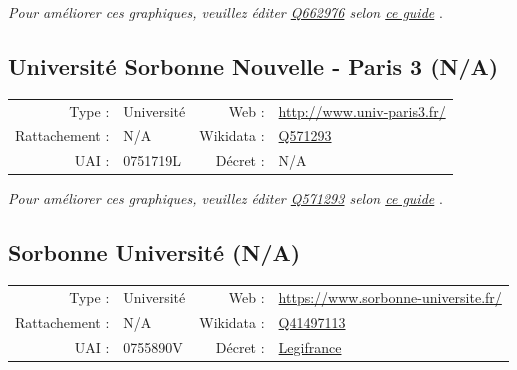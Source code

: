 \documentclass[11pt,french,landscape]{article}
\begin{document}
\textit{\scriptsize Pour améliorer ces graphiques, veuillez éditer \href{https://www.wikidata.org/entity/Q662976}{Q662976}  selon \href{https://github.com/cpesr/wikidataESR/blob/master/Rmd/wikidataESR.md}{ce guide}}
.


\newpage

\hypertarget{universituxe9-sorbonne-nouvelle---paris-3-na}{%
\subsection{Université Sorbonne Nouvelle - Paris 3
(N/A)}\label{universituxe9-sorbonne-nouvelle---paris-3-na}}

\begin{tabular*}{0.45\textwidth}{rp{2cm}rl}  
\hline  
Type : & Université & Web : &\href{http://www.univ-paris3.fr/}{http://www.univ-paris3.fr/} \\  
Rattachement : & N/A & Wikidata : & \href{https://www.wikidata.org/entity/Q571293}{Q571293} \\  
UAI : & 0751719L & Décret : & N/A \\  
\hline  
\end{tabular*}

\textit{\scriptsize Pour améliorer ces graphiques, veuillez éditer \href{https://www.wikidata.org/entity/Q571293}{Q571293}  selon \href{https://github.com/cpesr/wikidataESR/blob/master/Rmd/wikidataESR.md}{ce guide}}
.


\newpage

\hypertarget{sorbonne-universituxe9-na}{%
\subsection{Sorbonne Université (N/A)}\label{sorbonne-universituxe9-na}}

\begin{tabular*}{0.45\textwidth}{rp{2cm}rl}  
\hline  
Type : & Université & Web : &\href{https://www.sorbonne-universite.fr/}{https://www.sorbonne-universite.fr/} \\  
Rattachement : & N/A & Wikidata : & \href{https://www.wikidata.org/entity/Q41497113}{Q41497113} \\  
UAI : & 0755890V & Décret : & \href{https://www.legifrance.gouv.fr/affichTexte.do?cidTexte=JORFTEXT000034455357&categorieLien=id}{Legifrance} \\  
\hline  
\end{tabular*}
\end{document}
